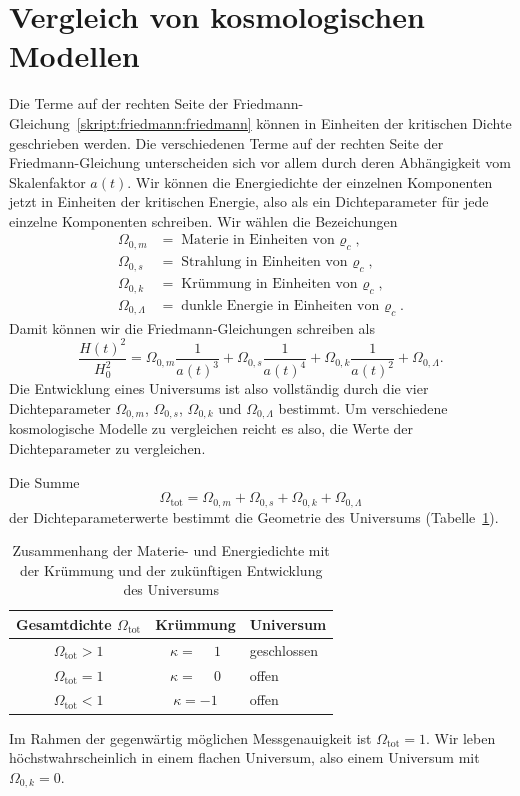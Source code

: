 \section{Vergleich von kosmologischen Modellen}
Die Terme auf der rechten Seite der
Friedmann-Gleichung~\eqref{skript:friedmann:friedmann}
können in Einheiten der kritischen Dichte geschrieben werden.
Die verschiedenen Terme auf der rechten Seite der Friedmann-Gleichung
unterscheiden sich vor allem durch deren Abhängigkeit vom Skalenfaktor $a(t)$.
Wir können die Energiedichte der einzelnen Komponenten jetzt in
Einheiten der kritischen Energie, also als ein Dichteparameter
für jede einzelne Komponenten schreiben.
%
Wir wählen die Bezeichungen
\begin{align*}
\Omega_{0,m}&=\text{Materie in Einheiten von $\varrho_c$},\\
\Omega_{0,s}&=\text{Strahlung in Einheiten von $\varrho_c$},\\
\Omega_{0,k}&=\text{Krümmung in Einheiten von $\varrho_c$},\\
\Omega_{0,\Lambda}&=\text{dunkle Energie in Einheiten von $\varrho_c$}.
\end{align*}
Damit können wir die Friedmann-Gleichungen schreiben als
\begin{equation}
\frac{H(t)^2}{H_0^2}
=
\Omega_{0,m}\frac1{a(t)^3}
+
\Omega_{0,s}\frac1{a(t)^4}
+
\Omega_{0,k}\frac1{a(t)^2}
+
\Omega_{0,\Lambda}.
\label{skript:friedmann:omegagleichung}
\end{equation}
Die Entwicklung eines Universums ist also vollständig durch die
vier Dichteparameter 
$\Omega_{0,m}$,
$\Omega_{0,s}$,
$\Omega_{0,k}$ und
$\Omega_{0,\Lambda}$
bestimmt.
Um verschiedene kosmologische Modelle zu vergleichen reicht es also,
die Werte der Dichteparameter zu vergleichen.

Die Summe
\[
\Omega_{\text{tot}}
=
\Omega_{0,m}
+
\Omega_{0,s}
+
\Omega_{0,k}
+
\Omega_{0,\Lambda}
\]
der Dichteparameterwerte bestimmt die Geometrie des Universums
(Tabelle~\ref{skript:friedmann:tabelle}).
\begin{table}
\centering
\begin{tabular}{|c|c|l|}
\hline
Gesamtdichte $\Omega_{\text{tot}}$&Krümmung&Universum\\
\hline
$\Omega_{\text{tot}}>1$&$\kappa = \phantom{-}1$&geschlossen\\
$\Omega_{\text{tot}}=1$&$\kappa = \phantom{-}0$&offen\\
$\Omega_{\text{tot}}<1$&$\kappa =-1$&offen\\
\hline
\end{tabular}
\caption{Zusammenhang der Materie- und Energiedichte mit der Krümmung
und der zukünftigen Entwicklung des Universums
\label{skript:friedmann:tabelle}}
\end{table}
Im Rahmen der gegenwärtig möglichen Messgenauigkeit ist
$\Omega_{\text{tot}}=1$. Wir leben höchstwahrscheinlich in
einem flachen Universum, also einem Universum mit $\Omega_{0,k}=0$.

